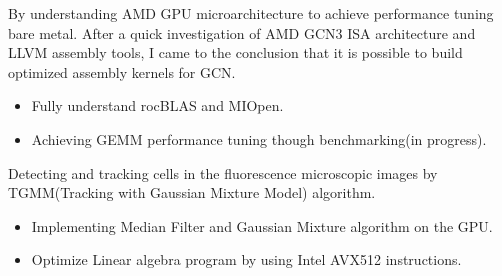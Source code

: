 \documentclass{resume}
\begin{document}
By understanding AMD GPU microarchitecture to achieve performance tuning bare metal.
After a quick investigation of AMD GCN3 ISA architecture and LLVM assembly tools, I came to the conclusion that it is possible to build optimized assembly kernels for GCN.
\begin{itemize}
    \item  Fully understand rocBLAS and MIOpen.
    \item Achieving GEMM performance tuning though benchmarking(in progress).
\end{itemize}

Detecting and tracking cells in the fluorescence microscopic images by TGMM(Tracking with Gaussian Mixture Model) algorithm.
\begin{itemize}
    \item Implementing Median Filter and Gaussian Mixture algorithm on the GPU.
    \item Optimize Linear algebra program by using Intel AVX512 instructions.
\end{itemize}
\end{document}
